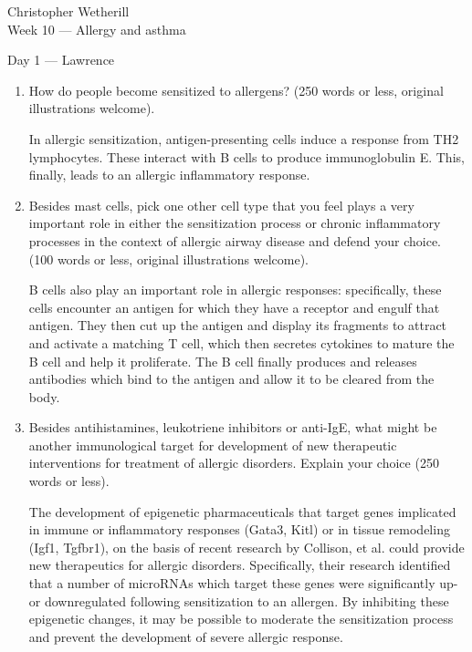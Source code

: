 \documentclass[11pt,final] {article}
\begin{document}
\noindent Christopher Wetherill\\
Week 10 --- Allergy and asthma

\begin{center}
	Day 1 --- Lawrence
\end{center}

\begin{enumerate}
	\item How do people become sensitized to allergens? (250 words or less, original illustrations welcome).
	
	In allergic sensitization, antigen-presenting cells induce a response from TH2 lymphocytes. These interact with B cells to produce immunoglobulin E. This, finally, leads to an allergic inflammatory response.
		
	\item Besides mast cells, pick one other cell type that you feel plays a very important role in either the sensitization process or chronic inflammatory processes in the context of allergic airway disease and defend your choice. (100 words or less, original illustrations welcome).
	
	B cells also play an important role in allergic responses: specifically, these cells encounter an antigen for which they have a receptor and engulf that antigen. They then cut up the antigen and display its fragments to attract and activate a matching T cell, which then secretes cytokines to mature the B cell and help it proliferate. The B cell finally produces and releases antibodies which bind to the antigen and allow it to be cleared from the body.
	
	\item Besides antihistamines, leukotriene inhibitors or anti-IgE, what might be another immunological target for development of new therapeutic interventions for treatment of allergic disorders. Explain your choice (250 words or less).
	
	The development of epigenetic pharmaceuticals that target genes implicated in immune or inflammatory responses (Gata3, Kitl) or in tissue remodeling (Igf1, Tgfbr1), on the basis of recent research by Collison, et al. could provide new therapeutics for allergic disorders. Specifically, their research identified that a number of microRNAs which target these genes were significantly up- or downregulated following sensitization to an allergen. By inhibiting these epigenetic changes, it may be possible to moderate the sensitization process and prevent the development of severe allergic response.
	
\end{enumerate}
\end{document}
